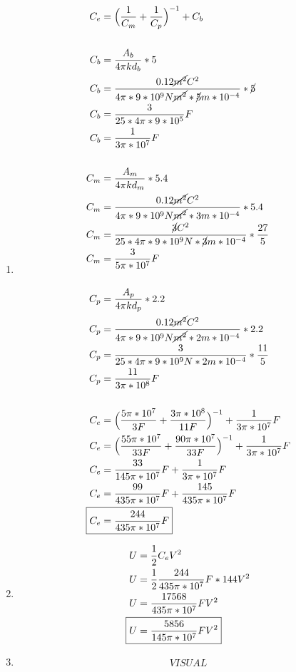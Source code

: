 \documentclass[10pt, twoside]{article}
\begin{document}
\begin{enumerate}[label=\alph*.]
	\item
		\begin{align*}
			C_e &= \Big{(} \frac{1}{C_m}+\frac{1}{C_p} \Big{)}^{-1}+C_b\\
			\\
			C_b &= \frac{A_b}{4\pi k d_b}*5\\
			C_b &= \frac{0.12\cancel{m^2}C^2}{4\pi *9*10^9N\cancel{m^2} *\cancel{5}m*10^{-4}}*\cancel{5}\\
			C_b &= \frac{3}{25*4\pi*9*10^5}F\\
			C_b &= \frac{1}{3\pi*10^7}F\\
			\\
			C_m &= \frac{A_m}{4\pi k d_m}*5.4\\
			C_m &= \frac{0.12\cancel{m^2}C^2}{4\pi*9*10^9N\cancel{m^2}*3m*10^{-4}}*5.4\\
			C_m &= \frac{\cancel{3}C^2}{25*4\pi*9*10^9N*\cancel{3}m*10^{-4}}* \frac{27}{5} \\
			C_m &= \frac{3}{5\pi*10^7}F\\
			\\
			C_p &= \frac{A_p}{4\pi k d_p}*2.2\\
			C_p &= \frac{0.12\cancel{m^2}C^2}{4\pi*9*10^9N\cancel{m^2}*2m*10^{-4}}* 2.2 \\
			C_p &= \frac{3}{25*4\pi*9*10^9N*2m*10^{-4}}* \frac{11}{5} \\
			C_p &= \frac{11}{3\pi*10^8}F\\
			\\
			C_e &= \Big{(} \frac{5\pi*10^7}{3F}+\frac{3\pi*10^8}{11F} \Big{)}^{-1}+\frac{1}{3\pi*10^7}F\\
			C_e &= \Big{(} \frac{55\pi*10^7}{33F}+\frac{90\pi*10^7}{33F} \Big{)}^{-1}+\frac{1}{3\pi*10^7}F\\
			C_e &= \frac{33}{145\pi*10^7}F +\frac{1}{3\pi*10^7}F\\
			C_e &= \frac{99}{435\pi*10^7}F +\frac{145}{435\pi*10^7}F\\
			\Aboxed
			{
				C_e &= \frac{244}{435\pi*10^7}F
			}
		\end{align*}
	\item
		\begin{align*}
			U &= \frac{1}{2} C_eV^2\\
			U &= \frac{1}{2} \frac{244}{435\pi*10^7}F*144V^2\\
			U &= \frac{17568}{435\pi*10^7}FV^2\\
			\Aboxed
			{
				U &= \frac{5856}{145\pi*10^7}FV^2
			}
		\end{align*}
	\item
		\begin{align*}
			VISUAL
		\end{align*}
\end{enumerate}
\end{document}
